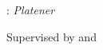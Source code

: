 \thispagestyle{empty}

\hfill

\vfill

\noindent\myName: \newline \emph{Platener} %
\newline \myTime

\bigskip

\noindent Supervised by \mySupervisor and \myProf 



%
%
%
